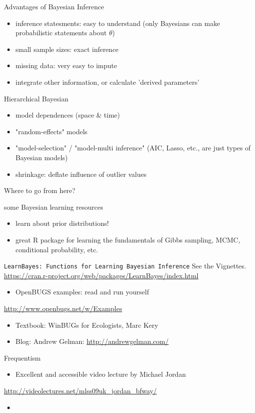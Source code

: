 \documentclass[presentation]{beamer}
\begin{document}
\begin{frame}[label=sec-37]{Advantages of Bayesian Inference}
\begin{itemize}
\item inference statesments: easy to understand (only Bayesians can make probabilistic statements about $\theta$)
\item small sample sizes: exact inference
\item missing data: very easy to impute
\item integrate other information, or calculate 'derived parameters'
\end{itemize}
\begin{block}{Hierarchical Bayesian}
\begin{itemize}
\item model dependences (space \& time)
\item "random-effects" models
\item "model-selection" / "model-multi inference" (AIC, Lasso, etc., are just types of Bayesian models)
\item shrinkage: deflate influence of outlier values
\end{itemize}
\end{block}
\end{frame}
\begin{frame}[label=sec-38]{Where to go from here?}
\begin{block}{some Bayesian learning resources}
\begin{itemize}
\item learn about prior distributions!
\item great R package for learning the fundamentals of Gibbs sampling, MCMC, conditional probability, etc.
\end{itemize}
\verb!LearnBayes: Functions for Learning Bayesian Inference! See the Vignettes. \url{https://cran.r-project.org/web/packages/LearnBayes/index.html}
\begin{itemize}
\item OpenBUGS examples: read and run yourself
\end{itemize}
\url{http://www.openbugs.net/w/Examples}
\begin{itemize}
\item Textbook: WinBUGs for Ecologists, Marc Kery
\item Blog: Andrew Gelman: \url{http://andrewgelman.com/}
\end{itemize}
\end{block}

\begin{block}{Frequentism}
\begin{itemize}
\item Excellent and accessible video lecture by Michael Jordan
\end{itemize}
\url{http://videolectures.net/mlss09uk_jordan_bfway/}
\begin{itemize}
\item 
\end{itemize}
\end{block}
\end{frame}
\end{document}
